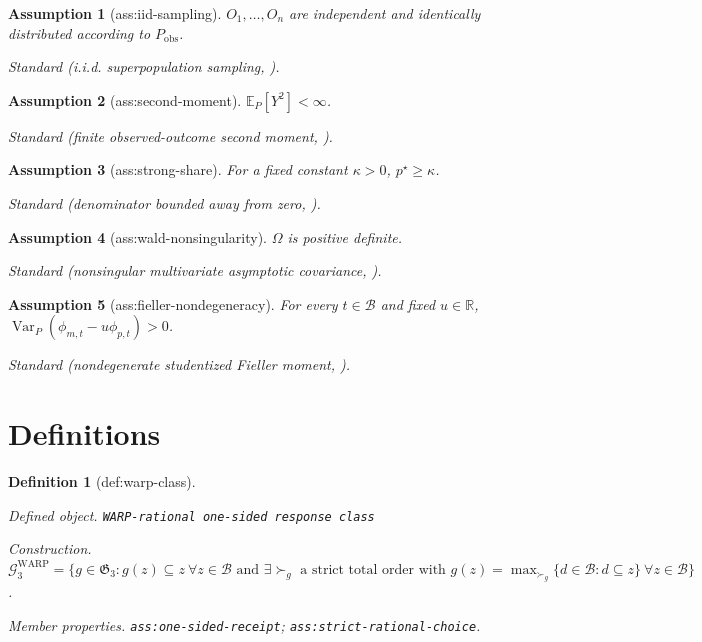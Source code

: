 \documentclass{article}
\newtheorem{assumption}{Assumption}
\newtheorem{definition}{Definition}
\begin{document}
\begin{assumption}[ass:iid-sampling]\label{ass:iid-sampling}
\(O_1,\ldots,O_n\) are independent and identically distributed according to \(P_{\mathrm{obs}}\).
\par\smallskip\noindent\emph{Standard} (i.i.d. superpopulation sampling, \cite{BlackwellPashley2023FactorialIV}).
\end{assumption}

\begin{assumption}[ass:second-moment]\label{ass:second-moment}
\(\mathbb E_P[Y^2]<\infty\).
\par\smallskip\noindent\emph{Standard} (finite observed-outcome second moment, \cite{BlackwellPashley2023FactorialIV}).
\end{assumption}

\begin{assumption}[ass:strong-share]\label{ass:strong-share}
For a fixed constant \(\kappa>0\), \(p^\star\ge\kappa\).
\par\smallskip\noindent\emph{Standard} (denominator bounded away from zero, \cite{BlackwellPashley2023FactorialIV}).
\end{assumption}

\begin{assumption}[ass:wald-nonsingularity]\label{ass:wald-nonsingularity}
\(\Omega\) is positive definite.
\par\smallskip\noindent\emph{Standard} (nonsingular multivariate asymptotic covariance, \cite{BlackwellPashley2023FactorialIV}).
\end{assumption}

\begin{assumption}[ass:fieller-nondegeneracy]\label{ass:fieller-nondegeneracy}
For every \(t\in\mathcal B\) and fixed \(u\in\mathbb R\), \(\operatorname{Var}_P(\phi_{m,t}-u\phi_{p,t})>0\).
\par\smallskip\noindent\emph{Standard} (nondegenerate studentized Fieller moment, \cite{KangPeckKeele2018RandomizationIV}).
\end{assumption}

\section{Definitions}

\begin{definition}[def:warp-class]\label{def:warp-class}
\par\smallskip\noindent\emph{Defined object.} \texttt{WARP-\allowbreak{}rational one-\allowbreak{}sided response class}
\par\smallskip\noindent\emph{Construction.} \(\mathcal G^{\mathrm{WARP}}_3=\{g\in\mathfrak G_3: g(z)\subseteq z\ \forall z\in\mathcal B\text{ and }\exists\succ_g\text{ a strict total order with }g(z)=\max_{\succ_g}\{d\in\mathcal B:d\subseteq z\}\ \forall z\in\mathcal B\}\).
\par\smallskip\noindent\emph{Member properties.} \texttt{ass:\allowbreak{}one-\allowbreak{}sided-\allowbreak{}receipt}; \texttt{ass:\allowbreak{}strict-\allowbreak{}rational-\allowbreak{}choice}.
\end{definition}
\end{document}
